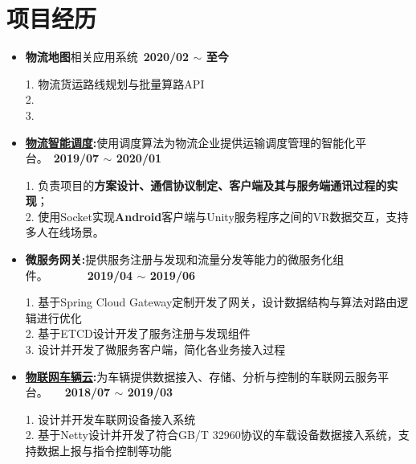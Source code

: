 \documentclass[letterpaper, UTF8, 11pt]{article}
\begin{document}
	\section*{\textbf{项目经历}}\vspace{-0.12in}
	\begin{itemize}	
		\item \textbf{物流地图}{相关应用系统}~\textbf{2020/02 $\sim$ 至今}
		
		1. 物流货运路线规划与批量算路API\\
		2. \\
		3. 
		
		\vspace{0.03in}

		\item \textbf{\href{https://lbsyun.baidu.com/solutions/scheduling}{物流智能调度}:}{使用调度算法为物流企业提供运输调度管理的智能化平台。}~\textbf{2019/07 $\sim$ 2020/01}
		
		1. 负责项目的\textbf{方案设计、通信协议制定、客户端及其与服务端通讯过程的实现}；\\
		2. 使用Socket实现\textbf{Android}客户端与Unity服务程序之间的VR数据交互，支持多人在线场景。
		
		\vspace{0.03in}

		\item \textbf{微服务网关:}{提供服务注册与发现和流量分发等能力的微服务化组件。}~~~~~~~\textbf{2019/04 $\sim$ 2019/06}
		
		1. 基于Spring Cloud Gateway定制开发了网关，设计数据结构与算法对路由逻辑进行优化\\
		2. 基于ETCD设计开发了服务注册与发现组件\\
		3. 设计并开发了微服务客户端，简化各业务接入过程
		
		\vspace{0.03in}
		
		\item \textbf{\href{https://cloud.baidu.com/product/dugo.html}{物联网车辆云}:}{为车辆提供数据接入、存储、分析与控制的车联网云服务平台。}~~~\textbf{2018/07 $\sim$ 2019/03}
		
		1. 设计并开发车联网设备接入系统\\
		2. 基于Netty设计并开发了符合GB/T 32960协议的车载设备数据接入系统，支持数据上报与指令控制等功能
		
		\vspace{0.03in}
		
	\end{itemize}
	\vspace{-0.32in}
\end{document}
